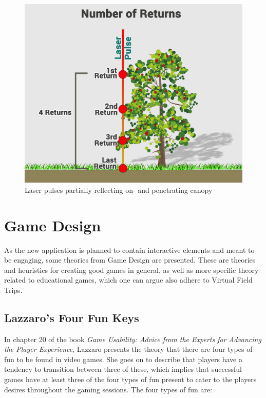         \FloatBarrier
        \begin{figure}[ht]
            \centering
            \includegraphics[width=0.5\linewidth]{figures/lidar.png}
            \caption{Laser pulses partially reflecting on- and penetrating canopy}
            \label{fig:transmission}
        \end{figure}
        \FloatBarrier
        
\section{Game Design}
\label{sec:game_design}
    As the new application is planned to contain interactive elements and meant to be engaging, some theories from Game Design are presented. These are theories and heuristics for creating good games in general, as well as more specific theory related to educational games, which one can argue also adhere to Virtual Field Trips.
        
    \subsection{Lazzaro's Four Fun Keys}
        In chapter 20 of the book \emph{Game Usability: Advice from the Experts for Advancing the Player Experience}\cite{lazzaro}, Lazzaro presents the theory that there are four types of fun to be found in video games. She goes on to describe that players have a tendency to transition between three of these, which implies that successful games have at least three of the four types of fun present to cater to the players desires throughout the gaming sessions. The four types of fun are:
        
